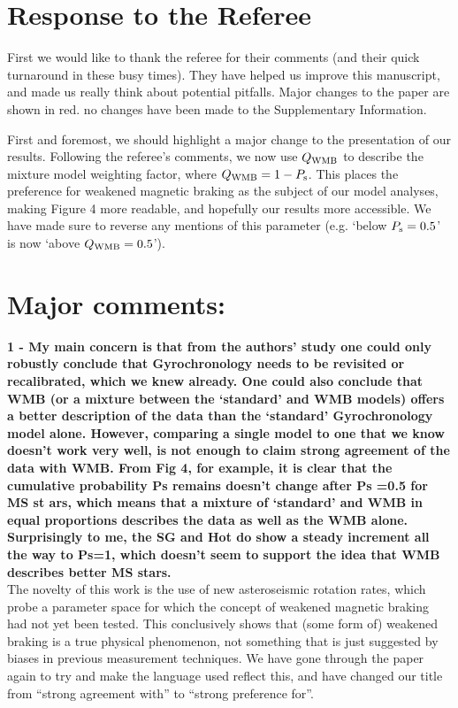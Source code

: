 \documentclass[11pt]{article}
\begin{document}
	
\section*{Response to the Referee}

First we would like to thank the referee for their comments (and their quick turnaround in these busy times). They have helped us improve this manuscript, and made us really think about potential pitfalls. Major changes to the paper are shown in red. no changes have been made to the Supplementary Information.

First and foremost, we should highlight a major change to the presentation of our results. Following the referee’s comments, we now use $Q_{\rm WMB}$ to describe the mixture model weighting factor, where $Q_{\rm WMB} = 1 - P_{\rm s}$. This places the preference for weakened magnetic braking as the subject of our model analyses, making Figure 4 more readable, and hopefully our results more accessible. We have made sure to reverse any mentions of this parameter (e.g. ‘below $P_{\rm s} = 0.5$’ is now ‘above $Q_{\rm WMB} = 0.5$’).

\section*{Major comments:}

\noindent\noindent\textbf{ 1 - My main concern is that from the authors’ study one could only robustly conclude that Gyrochronology needs to be revisited or recalibrated, which we knew already. One could also conclude that WMB (or a mixture between the ‘standard’ and WMB models) offers a better description of the data than the ‘standard’ Gyrochronology model alone. However, comparing a single model to one that we know doesn’t work very well, is not enough to claim strong agreement of the data with WMB. From Fig 4, for example, it is clear that the cumulative probability Ps remains doesn’t change after Ps =0.5 for MS st	ars, which means that a mixture of ‘standard’ and WMB in equal proportions describes the data as well as the WMB alone. Surprisingly to me, the SG and Hot do show a steady increment all the way to Ps=1, which doesn’t seem to support the idea that WMB describes better MS stars.}\\

The novelty of this work is the use of new asteroseismic rotation rates, which probe a parameter space for which the concept of weakened magnetic braking had not yet been tested. This conclusively shows that (some form of) weakened braking is a true physical phenomenon, not something that is just suggested by biases in previous measurement techniques. We have gone through the paper again to try and make the language used reflect this, and have changed our title from “strong agreement with” to “strong preference for”.
\end{document}
